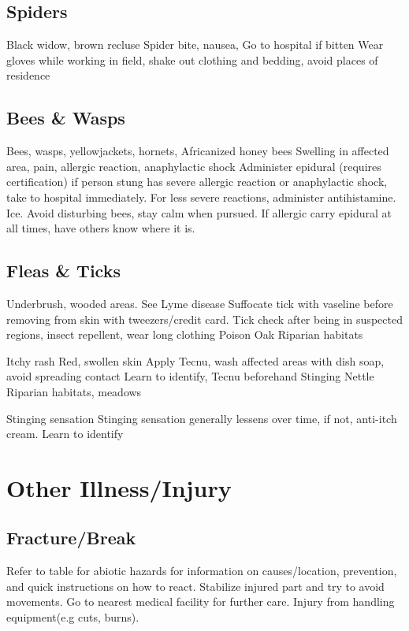\documentclass[12pt]{../SOP2}
\begin{document}
\subsection{Spiders}

Black widow, brown recluse
Spider bite, nausea, 
Go to hospital if bitten
Wear gloves while working in field, shake out clothing and bedding, avoid places of residence

\subsection{Bees \& Wasps}

Bees, wasps, yellowjackets, hornets, Africanized honey bees
Swelling in affected area, pain, allergic reaction, anaphylactic shock
Administer epidural (requires certification) if person stung has severe allergic reaction or anaphylactic shock, take to hospital immediately. For less severe reactions, administer antihistamine. Ice.
Avoid disturbing bees, stay calm when pursued. If allergic carry epidural at all times, have others know where it is.

\subsection{Fleas \& Ticks}

Underbrush, wooded areas.
See Lyme disease
Suffocate tick with vaseline before removing from skin with tweezers/credit card.
Tick check after being in suspected regions, insect repellent, wear long clothing
Poison Oak
Riparian habitats

Itchy rash
Red, swollen skin
Apply Tecnu, wash affected areas with dish soap, avoid spreading contact
Learn to identify, Tecnu beforehand
Stinging Nettle
Riparian habitats, meadows

Stinging sensation
Stinging sensation generally lessens over time, if not, anti-itch cream.
Learn to identify


\section{Other Illness/Injury}

\subsection{Fracture/Break}

\NP Refer to table for abiotic hazards for information on causes/location, prevention, and quick instructions on how to react. Stabilize injured part and try to avoid movements. Go to nearest medical facility for further care.
Injury from handling equipment(e.g cuts, burns).
\end{document}
